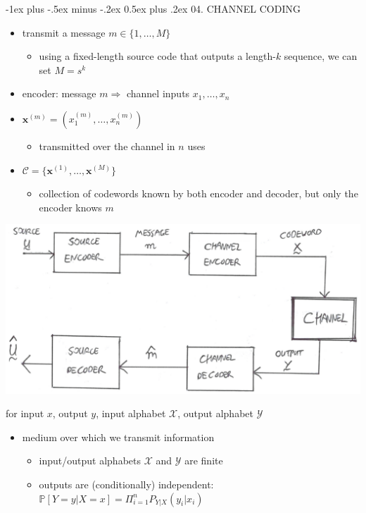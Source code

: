 \documentclass[10pt, landscape]{article}
\makeatletter
\renewcommand{\section}{\@startsection{section}{1}{0mm}%
  {-1ex plus -.5ex minus -.2ex}%
  {0.5ex plus .2ex}%
{\normalfont\large\bfseries}}
\makeatother
\begin{document}
\begin{multicols*}{4}
  \section{04. CHANNEL CODING}

  \begin{itemize}
    \item transmit a message $m \in \{1, \dots, M\}$ 
      \begin{itemize}
        \item using a fixed-length source code that outputs a length-$k$ sequence, we can set $M=s^k$
      \end{itemize}
    \item encoder: message $m \Rightarrow$ channel inputs $x_1, \dots, x_n$
    \item {} $\mathbf{x}^{(m)} = (x_1^{(m)}, \dots, x_n^{(m)})$
      \begin{itemize}
        \item transmitted over the channel in $n$ uses
      \end{itemize}
    \item {} $\mathcal{C} = \{\mathbf{x}^{(1)}, \dots, \mathbf{x}^{(M)}\}$
      \begin{itemize}
        \item collection of codewords known by both encoder and decoder, but only the encoder knows $m$
      \end{itemize}
  \end{itemize}

  \includegraphics[width=0.95\linewidth]{cs3236-full-communication-setup.png} 

  for input $x$, output $y$, input alphabet $\mathcal{X}$, output alphabet $\mathcal{Y}$

  \begin{itemize}
    \item {} medium over which we transmit information
      \begin{itemize}
        \item {} input/output alphabets $\mathcal{X}$ and $\mathcal{Y}$ are finite
        \item {} outputs are (conditionally) independent: $\mathbb{P}[Y=y \vert X=x] = \Pi^n_{i=1} P_{Y \vert X} (y_i \vert x_i)$
      \end{itemize}
  \end{itemize}


\end{multicols*}
\end{document}
